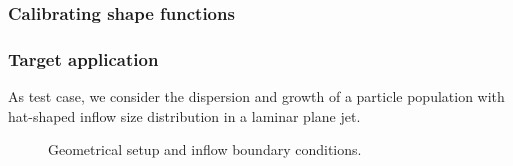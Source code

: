 \documentclass[10pt,xcolor=dvipsnames]{beamer}
\begin{document}
\begin{frame}[t]

  \frametitle{Calibrating shape functions}
  
  \newcommand{\snapf}{\left(\begin{array}{@{}c>{\columncolor{black!10}}cc@{}} F_1(\tau_1) &F_2(\tau_1) &\cdots \\ F_1(\tau_2) &F_2(\tau_2) &\cdots \\ \vdots &\vdots &\ddots \end{array}\right)}
  \newcommand{\snapv}{\left(\begin{array}{@{}c>{\columncolor{black!10}}cc@{}} \bar{l}_1(\tau_1) &\bar{l}_2(\tau_1) &\cdots \\ \bar{l}_1(\tau_2) &\bar{l}_2(\tau_2) &\cdots \\ \vdots &\vdots &\ddots \end{array}\right)}
  \newcommand{\vecphi}{\left(\begin{array}{@{}c>{\columncolor{black!10}}cc@{}}\phi_1(\tau_1) &\phi_2(\tau_1) &\cdots \\ \phi_1(\tau_2) &\phi_2(\tau_2) &\cdots \\ \vdots &\vdots &\ddots \end{array}\right)}
  \newcommand{\vecpsi}{\left(\begin{array}{@{}cc@{}}\psi_1(\tau_1) &\cdots \\ \psi_1(\tau_2) &\cdots \\ \vdots &\ddots \end{array}\right)}
  \resizebox{\columnwidth}{!}{}

\end{frame}


\begin{frame}[t]
  
  \frametitle{Target application}
  
  \justifying As test case, we consider the dispersion and growth of a particle population with hat-shaped inflow size distribution in a laminar plane jet.
  \vspace{-0.5\baselineskip}
  
  \begin{figure}
  \begin{center}
  \resizebox{\columnwidth}{!}{}
  \caption[Geometrical setup of a laminar plane jet test case]{Geometrical setup and inflow boundary conditions.}
  \label{fig:setup}
  \end{center}
  \end{figure}
    
\end{frame}
\end{document}
